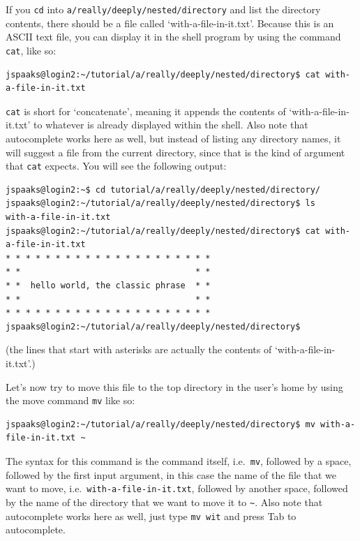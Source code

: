 If you \lstinline[style=bashinline]{cd} into \lstinline{a/really/deeply/nested/directory} and list the directory contents, there should be a file called `with-a-file-in-it.txt'. Because this is an \mbox{ASCII} text file, you can display it in the shell program by using the command \lstinline[style=bashinline]{cat}, like so:
\begin{lstlisting}[style=basic,style=bash]
jspaaks@login2:~/tutorial/a/really/deeply/nested/directory$ cat with-a-file-in-it.txt
\end{lstlisting}

\lstinline[style=bashinline]{cat} is short for `concatenate', meaning it appends the contents of `with-a-file-in-it.txt' to whatever is already displayed within the shell. Also note that autocomplete works here as well, but instead of listing any directory names, it will suggest a file from the current directory, since that is the kind of argument that \lstinline[style=bashinline]{cat} expects. You will see the following output:
\begin{lstlisting}[style=basic,style=bash]
jspaaks@login2:~$ cd tutorial/a/really/deeply/nested/directory/
jspaaks@login2:~/tutorial/a/really/deeply/nested/directory$ ls
with-a-file-in-it.txt
jspaaks@login2:~/tutorial/a/really/deeply/nested/directory$ cat with-a-file-in-it.txt
* * * * * * * * * * * * * * * * * * * * *
* *                                   * *
* *  hello world, the classic phrase  * *
* *                                   * *
* * * * * * * * * * * * * * * * * * * * *
jspaaks@login2:~/tutorial/a/really/deeply/nested/directory$
\end{lstlisting}
(the lines that start with asterisks are actually the contents of `with-a-file-in-it.txt'.)

Let's now try to move this file to the top directory in the user's home by using the move command \lstinline[style=bashinline]{mv} like so:
\begin{lstlisting}[style=basic,style=bash]
jspaaks@login2:~/tutorial/a/really/deeply/nested/directory$ mv with-a-file-in-it.txt ~
\end{lstlisting}
The syntax for this command is the command itself, i.e.~\lstinline[style=bashinline]{mv}, followed by a space, followed by the first input argument, in this case the name of the file that we want to move, i.e.~\lstinline[style=bashinline]{with-a-file-in-it.txt}, followed by another space, followed by the name of the directory that we want to move it to \lstinline[style=bashinline]{~}. Also note that autocomplete works here as well, just type \lstinline[style=bashinline]{mv wit} and press Tab to autocomplete.

